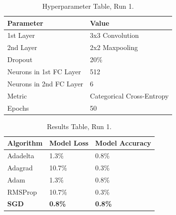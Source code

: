 \documentclass[report, 11pt, oneside]{dissertation}
\begin{document}
\begin{table}[H]
\centering
	\begin{tabular}{|l|l|}
		\hline
		Parameter               & Value                     \\ \hline
		1st Layer               & 3x3 Convolution           \\ \hline
		2nd Layer               & 2x2 Maxpooling            \\ \hline
		Dropout                 & 20\%                      \\ \hline
		Neurons in 1st FC Layer & 512                       \\ \hline
		Neurons in 2nd FC Layer & 6                         \\ \hline
		Metric                  & Categorical Cross-Entropy \\ \hline
		Epochs                  & 50                        \\ \hline
		\end{tabular}
	\caption{Hyperparameter Table, Run 1.}
	\label{tab:parameters_1}
\end{table}



\begin{table}[H]
	\centering
	\begin{tabular}{|l|l|l|}
	\hline
		Algorithm    & Model Loss     & Model Accuracy \\ \hline
		Adadelta     & 1.3\%          & 0.8\%          \\ \hline
		Adagrad      & 10.7\%         & 0.3\%          \\ \hline
		Adam         & 1.3\%          & 0.8\%          \\ \hline
		RMSProp      & 10.7\%         & 0.3\%          \\ \hline
		\textbf{SGD} & \textbf{0.8\%} & \textbf{0.8\%} \\ \hline
		\end{tabular}
	\caption{Results Table, Run 1.}
	\label{tab:results_1}
\end{table}

\ \
\end{document}
